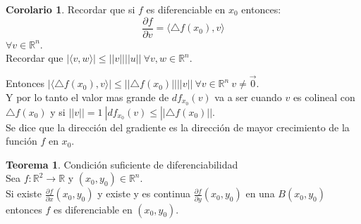 \documentclass[10pt]{article}
\theoremstyle{definition}
\newtheorem{theorem}{Teorema}[section]
\newtheorem{corollary}{Corolario}[theorem]
\begin{document}
\begin{corollary}
    Recordar que si $f$ es diferenciable en $x_0$ entonces: $$\frac{\partial f}{\partial v}=\langle \triangle f(x_0),v\rangle$$ $\forall v \in \mathbb{R}^n$.\\
    Recordar que $|\langle v,w\rangle|\le ||v||||u||\ \forall v,w\in\mathbb{R}^n$.
\end{corollary}
Entonces $|\langle \triangle f(x_0),v\rangle|\le ||\triangle f(x_0)|| ||v||\ \forall v\in\mathbb{R}^n\ v\neq\vec{0}$.
\\Y por lo tanto el valor mas grande de $df_{x_0}(v)$ va a ser cuando $v$ es colineal con $\triangle f(x_0)$ y si $||v||=1\ |df_{x_0}(v)\le ||\triangle f(x_0)||$.
\\Se dice que la dirección del gradiente es la dirección de mayor crecimiento de la función $f$ en $x_0$.
\begin{theorem}{Condición suficiente de diferenciabilidad}
    \\Sea $f:\mathbb{R}^2\to\mathbb{R}$ y $(x_0,y_0)\in\mathbb{R}^n$.
    \\Si existe $\frac{\partial f}{\partial x} (x_0,y_0)$ y existe y es continua $\frac{\partial f}{\partial y}(x_0,y_0)$ en una $B(x_0,y_0)$ entonces $f$ es diferenciable en $(x_0,y_0)$.
\end{theorem}
\end{document}
